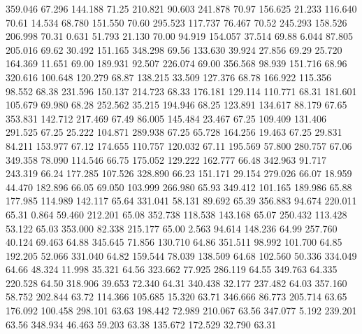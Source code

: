  359.046   67.296  144.188        71.25
 210.821   90.603  241.878        70.97
 156.625   21.233  116.640        70.61
  14.534   68.780  151.550        70.60
 295.523  117.737   76.467        70.52
 245.293  158.526  206.998        70.31
   0.631   51.793   21.130        70.00
  94.919  154.057   37.514        69.88
   6.044   87.805  205.016        69.62
  30.492  151.165  348.298        69.56
 133.630   39.924   27.856        69.29
  25.720  164.369   11.651        69.00
 189.931   92.507  226.074        69.00
 356.568   98.939  151.716        68.96
 320.616  100.648  120.279        68.87
 138.215   33.509  127.376        68.78
 166.922  115.356   98.552        68.38
 231.596  150.137  214.723        68.33
 176.181  129.114  110.771        68.31
 181.601  105.679   69.980        68.28
 252.562   35.215  194.946        68.25
 123.891  134.617   88.179        67.65
 353.831  142.712  217.469        67.49
  86.005  145.484   23.467        67.25
 109.409  131.406  291.525        67.25
  25.222  104.871  289.938        67.25
  65.728  164.256   19.463        67.25
  29.831   84.211  153.977        67.12
 174.655  110.757  120.032        67.11
 195.569   57.800  280.757        67.06
 349.358   78.090  114.546        66.75
 175.052  129.222  162.777        66.48
 342.963   91.717  243.319        66.24
 177.285  107.526  328.890        66.23
 151.171   29.154  279.026        66.07
  18.959   44.470  182.896        66.05
  69.050  103.999  266.980        65.93
 349.412  101.165  189.986        65.88
 177.985  114.989  142.117        65.64
 331.041   58.131   89.692        65.39
 356.883   94.674  220.011        65.31
   0.864   59.460  212.201        65.08
 352.738  118.538  143.168        65.07
 250.432  113.428   53.122        65.03
 353.000   82.338  215.177        65.00
   2.563   94.614  148.236        64.99
 257.760   40.124   69.463        64.88
 345.645   71.856  130.710        64.86
 351.511   98.992  101.700        64.85
 192.205   52.066  331.040        64.82
 159.544   78.039  138.509        64.68
 102.560   50.336  334.049        64.66
  48.324   11.998   35.321        64.56
 323.662   77.925  286.119        64.55
 349.763   64.335  220.528        64.50
 318.906   39.653   72.340        64.31
 340.438   32.177  237.482        64.03
 357.160   58.752  202.844        63.72
 114.366  105.685   15.320        63.71
 346.666   86.773  205.714        63.65
 176.092  100.458  298.101        63.63
 198.442   72.989  210.067        63.56
 347.077    5.192  239.201        63.56
 348.934   46.463   59.203        63.38
 135.672  172.529   32.790        63.31
